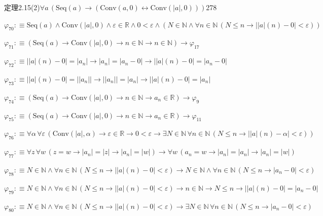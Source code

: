 \begin{fullproof}{定理2.15(2)}{$\forall a\,(\mathrm{Seq}(a) \to (\mathrm{Conv}(a,0) \leftrightarrow \mathrm{Conv}(\lvert a \rvert,0)))$}{278}
\begin{abbrevlist}
\item $\varphi_{70} :\equiv \mathrm{Seq}(a) \land \mathrm{Conv}(\lvert a \rvert,0) \land \varepsilon \in \mathbb{R} \land 0 < \varepsilon \land (N \in \mathbb{N} \land \forall n \in \mathbb{N}\,(N \leq n \to \lvert \lvert a \rvert(n) - 0 \rvert < \varepsilon))$
\item $\varphi_{71} :\equiv (\mathrm{Seq}(a) \to \mathrm{Conv}(\lvert a \rvert,0) \to n \in \mathbb{N} \to n \in \mathbb{N}) \to \varphi_{17}$
\item $\varphi_{72} :\equiv \lvert \lvert a \rvert(n) - 0 \rvert = \lvert a_{n} \rvert \to \lvert a_{n} \rvert = \lvert a_{n} - 0 \rvert \to \lvert \lvert a \rvert(n) - 0 \rvert = \lvert a_{n} - 0 \rvert$
\item $\varphi_{73} :\equiv \lvert \lvert a \rvert(n) - 0 \rvert = \lvert \lvert a_{n} \rvert \rvert \to \lvert \lvert a_{n} \rvert \rvert = \lvert a_{n} \rvert \to \lvert \lvert a \rvert(n) - 0 \rvert = \lvert a_{n} \rvert$
\item $\varphi_{74} :\equiv (\mathrm{Seq}(a) \to \mathrm{Conv}(\lvert a \rvert,0) \to n \in \mathbb{N} \to a_{n} \in \mathbb{R}) \to \varphi_{9}$
\item $\varphi_{75} :\equiv (\mathrm{Seq}(a) \to \mathrm{Conv}(\lvert a \rvert,0) \to n \in \mathbb{N} \to a_{n} \in \mathbb{R}) \to \varphi_{11}$
\item $\varphi_{76} :\equiv \forall \alpha\,\forall \varepsilon\,(\mathrm{Conv}(\lvert a \rvert,\alpha) \to \varepsilon \in \mathbb{R} \to 0 < \varepsilon \to \exists N \in \mathbb{N}\,\forall n \in \mathbb{N}\,(N \leq n \to \lvert \lvert a \rvert(n) - \alpha \rvert < \varepsilon))$
\item $\varphi_{77} :\equiv \forall z\,\forall w\,(z = w \to \lvert a_{n} \rvert = \lvert z \rvert \to \lvert a_{n} \rvert = \lvert w \rvert) \to \forall w\,(a_{n} = w \to \lvert a_{n} \rvert = \lvert a_{n} \rvert \to \lvert a_{n} \rvert = \lvert w \rvert)$
\item $\varphi_{78} :\equiv N \in \mathbb{N} \land \forall n \in \mathbb{N}\,(N \leq n \to \lvert \lvert a \rvert(n) - 0 \rvert < \varepsilon) \to N \in \mathbb{N} \land \forall n \in \mathbb{N}\,(N \leq n \to \lvert a_{n} - 0 \rvert < \varepsilon)$
\item $\varphi_{79} :\equiv N \in \mathbb{N} \land \forall n \in \mathbb{N}\,(N \leq n \to \lvert \lvert a \rvert(n) - 0 \rvert < \varepsilon) \to n \in \mathbb{N} \to N \leq n \to \lvert \lvert a \rvert(n) - 0 \rvert = \lvert a_{n} - 0 \rvert$
\item $\varphi_{80} :\equiv N \in \mathbb{N} \land \forall n \in \mathbb{N}\,(N \leq n \to \lvert \lvert a \rvert(n) - 0 \rvert < \varepsilon) \to \exists N \in \mathbb{N}\,\forall n \in \mathbb{N}\,(N \leq n \to \lvert a_{n} - 0 \rvert < \varepsilon)$

\end{abbrevlist}
\end{fullproof}
